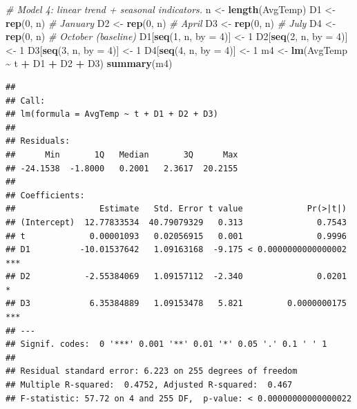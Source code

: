 \documentclass[
  10pt,
]{extarticle}
\newenvironment{Shaded}{\begin{snugshade}}{\end{snugshade}}
\newcommand{\AttributeTok}[1]{\textcolor[rgb]{0.13,0.29,0.53}{#1}}
\newcommand{\CommentTok}[1]{\textcolor[rgb]{0.56,0.35,0.01}{\textit{#1}}}
\newcommand{\DecValTok}[1]{\textcolor[rgb]{0.00,0.00,0.81}{#1}}
\newcommand{\FunctionTok}[1]{\textcolor[rgb]{0.13,0.29,0.53}{\textbf{#1}}}
\newcommand{\NormalTok}[1]{#1}
\newcommand{\OtherTok}[1]{\textcolor[rgb]{0.56,0.35,0.01}{#1}}
\newcommand{\SpecialCharTok}[1]{\textcolor[rgb]{0.81,0.36,0.00}{\textbf{#1}}}
\begin{document}
\begin{Shaded}
\begin{Highlighting}[]
\CommentTok{\# Model 4: linear trend + seasonal indicators.}
\NormalTok{n }\OtherTok{\textless{}{-}} \FunctionTok{length}\NormalTok{(AvgTemp)}
\NormalTok{D1 }\OtherTok{\textless{}{-}} \FunctionTok{rep}\NormalTok{(}\DecValTok{0}\NormalTok{, n)  }\CommentTok{\# January}
\NormalTok{D2 }\OtherTok{\textless{}{-}} \FunctionTok{rep}\NormalTok{(}\DecValTok{0}\NormalTok{, n)  }\CommentTok{\# April}
\NormalTok{D3 }\OtherTok{\textless{}{-}} \FunctionTok{rep}\NormalTok{(}\DecValTok{0}\NormalTok{, n)  }\CommentTok{\# July}
\NormalTok{D4 }\OtherTok{\textless{}{-}} \FunctionTok{rep}\NormalTok{(}\DecValTok{0}\NormalTok{, n)  }\CommentTok{\# October (baseline)}
\NormalTok{D1[}\FunctionTok{seq}\NormalTok{(}\DecValTok{1}\NormalTok{, n, }\AttributeTok{by =} \DecValTok{4}\NormalTok{)] }\OtherTok{\textless{}{-}} \DecValTok{1}
\NormalTok{D2[}\FunctionTok{seq}\NormalTok{(}\DecValTok{2}\NormalTok{, n, }\AttributeTok{by =} \DecValTok{4}\NormalTok{)] }\OtherTok{\textless{}{-}} \DecValTok{1}
\NormalTok{D3[}\FunctionTok{seq}\NormalTok{(}\DecValTok{3}\NormalTok{, n, }\AttributeTok{by =} \DecValTok{4}\NormalTok{)] }\OtherTok{\textless{}{-}} \DecValTok{1}
\NormalTok{D4[}\FunctionTok{seq}\NormalTok{(}\DecValTok{4}\NormalTok{, n, }\AttributeTok{by =} \DecValTok{4}\NormalTok{)] }\OtherTok{\textless{}{-}} \DecValTok{1}
\NormalTok{m4 }\OtherTok{\textless{}{-}} \FunctionTok{lm}\NormalTok{(AvgTemp }\SpecialCharTok{\textasciitilde{}}\NormalTok{ t }\SpecialCharTok{+}\NormalTok{ D1 }\SpecialCharTok{+}\NormalTok{ D2 }\SpecialCharTok{+}\NormalTok{ D3)}
\FunctionTok{summary}\NormalTok{(m4)}
\end{Highlighting}
\end{Shaded}

\begin{verbatim}
## 
## Call:
## lm(formula = AvgTemp ~ t + D1 + D2 + D3)
## 
## Residuals:
##      Min       1Q   Median       3Q      Max 
## -24.1538  -1.8000   0.2001   2.3617  20.2155 
## 
## Coefficients:
##                 Estimate   Std. Error t value             Pr(>|t|)    
## (Intercept)  12.77833534  40.79079329   0.313               0.7543    
## t             0.00001093   0.02056915   0.001               0.9996    
## D1          -10.01537642   1.09163168  -9.175 < 0.0000000000000002 ***
## D2           -2.55384069   1.09157112  -2.340               0.0201 *  
## D3            6.35384889   1.09153478   5.821         0.0000000175 ***
## ---
## Signif. codes:  0 '***' 0.001 '**' 0.01 '*' 0.05 '.' 0.1 ' ' 1
## 
## Residual standard error: 6.223 on 255 degrees of freedom
## Multiple R-squared:  0.4752, Adjusted R-squared:  0.467 
## F-statistic: 57.72 on 4 and 255 DF,  p-value: < 0.00000000000000022
\end{verbatim}
\end{document}
